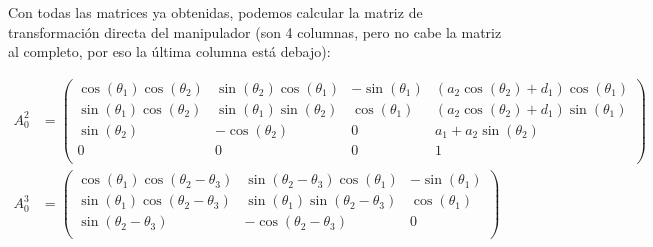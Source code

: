 \documentclass[a4paper,12pt]{article}
\begin{document}
Con todas las matrices ya obtenidas, podemos calcular la matriz de
transformación directa del manipulador (son 4 columnas, pero no cabe la matriz al completo, por eso la última columna está debajo):

{\footnotesize\begin{align*}
    A_0^2 & =
    \begin{pmatrix}
        \cos{\left(\theta_{1} \right)} \cos{\left(\theta_{2} \right)} & \sin{\left(\theta_{2} \right)} \cos{\left(\theta_{1} \right)} & - \sin{\left(\theta_{1} \right)} & \left(a_{2} \cos{\left(\theta_{2} \right)} + d_{1}\right) \cos{\left(\theta_{1} \right)} \\
        \sin{\left(\theta_{1} \right)} \cos{\left(\theta_{2} \right)} & \sin{\left(\theta_{1} \right)} \sin{\left(\theta_{2} \right)} & \cos{\left(\theta_{1} \right)}   & \left(a_{2} \cos{\left(\theta_{2} \right)} + d_{1}\right) \sin{\left(\theta_{1} \right)} \\
        \sin{\left(\theta_{2} \right)}                                & - \cos{\left(\theta_{2} \right)}                              & 0                                & a_{1} + a_{2} \sin{\left(\theta_{2} \right)}                                             \\
        0                                                             & 0                                                             & 0                                & 1                                                                                        \\
    \end{pmatrix} \\
    A_0^3 & =
    \begin{pmatrix}
        \cos{\left(\theta_{1} \right)} \cos{\left(\theta_{2} - \theta_{3} \right)} & \sin{\left(\theta_{2} - \theta_{3} \right)} \cos{\left(\theta_{1} \right)}                                                                          & - \sin{\left(\theta_{1} \right)} \\
        \sin{\left(\theta_{1} \right)} \cos{\left(\theta_{2} - \theta_{3} \right)} & \sin{\left(\theta_{1} \right)} \sin{\left(\theta_{2} - \theta_{3} \right)}                                                                          & \cos{\left(\theta_{1} \right)}   \\
        \sin{\left(\theta_{2} - \theta_{3} \right)}                                & - \cos{\left(\theta_{2} - \theta_{3} \right)}                                                                                                       & 0                                \\

\end{pmatrix}
\end{align*}}
\end{document}
